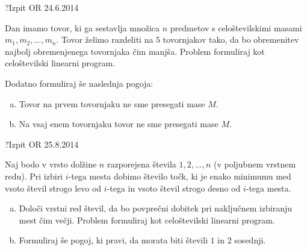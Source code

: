 \begin{naloga}{?}{Izpit OR 24.6.2014}
\begin{vprasanje}[tovor]
Dan imamo tovor,
ki ga sestavlja množica $n$ predmetov
s celoštevilskimi masami $m_1, m_2, \dots, m_n$.
Tovor želimo razdeliti na $5$ tovornjakov tako,
da bo obremenitev najbolj obremenjenega tovornjaka čim manjša.
Problem formuliraj kot celoštevilski linearni program.

Dodatno formuliraj še naslednja pogoja:
\begin{enumerate}[(a)]
\item Tovor na prvem tovornjaku ne sme presegati mase $M$.
\item Na vsaj enem tovornjaku tovor ne sme presegati mase $M$.
\end{enumerate}
\end{vprasanje}
\begin{odgovor}
\end{odgovor}
\end{naloga}


\begin{naloga}{?}{Izpit OR 25.8.2014}
\begin{vprasanje}[stevila]
Naj bodo v vrsto dolžine $n$ razporejena števila $1, 2, \dots, n$
(v poljubnem vrstnem redu).
Pri izbiri $i$-tega mesta dobimo število točk,
ki je enako minimumu med vsoto števil strogo levo od $i$-tega
in vsoto števil strogo desno od $i$-tega mesta.
\begin{enumerate}[(a)]
\item Določi vrstni red števil,
da bo povprečni dobitek pri naključnem izbiranju mest čim večji.
Problem formuliraj kot celoštevilski linearni program.

\item Formuliraj še pogoj, ki pravi,
da morata biti števili $1$ in $2$ sosednji.
\end{enumerate}
\end{vprasanje}
\begin{odgovor}
\end{odgovor}
\end{naloga}



